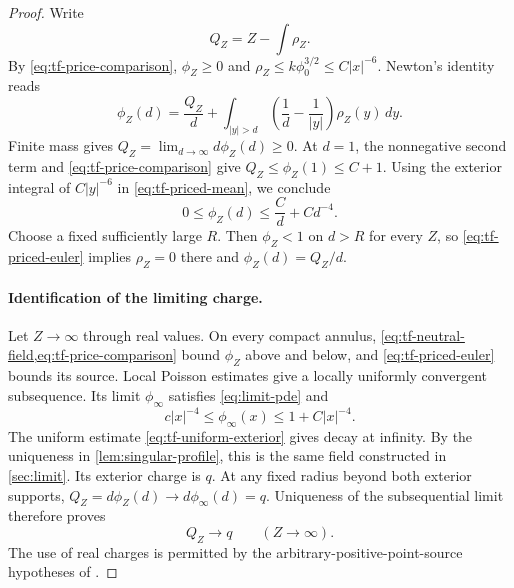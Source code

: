 \begin{proof}
Write
\[
 Q_Z=Z-\int\rho_Z.
\]
By \cref{eq:tf-price-comparison}, $\phi_Z\ge0$ and
$\rho_Z\le k\phi_0^{3/2}\le C|x|^{-6}$.  Newton's identity reads
\begin{equation}\label{eq:tf-priced-mean}
 \phi_Z(d)=\frac{Q_Z}{d}
       +\int_{|y|>d}\left(\frac1d-\frac1{|y|}\right)\rho_Z(y)\,dy.
\end{equation}
Finite mass gives $Q_Z=\lim_{d\to\infty}d\phi_Z(d)\ge0$.
At $d=1$, the nonnegative second term and
\cref{eq:tf-price-comparison} give $Q_Z\le\phi_Z(1)\le C+1$.
Using the exterior integral of $C|y|^{-6}$ in
\cref{eq:tf-priced-mean}, we conclude
\begin{equation}\label{eq:tf-uniform-exterior}
 0\le\phi_Z(d)\le\frac C d+Cd^{-4}.
\end{equation}
Choose a fixed sufficiently large $R$.  Then $\phi_Z<1$ on $d>R$ for
every $Z$, so \cref{eq:tf-priced-euler} implies $\rho_Z=0$ there and
$\phi_Z(d)=Q_Z/d$.

\paragraph{Identification of the limiting charge.}
Let $Z\to\infty$ through real values.  On every compact annulus,
\cref{eq:tf-neutral-field,eq:tf-price-comparison} bound $\phi_Z$ above
and below, and \cref{eq:tf-priced-euler} bounds its source.  Local Poisson
estimates give a locally uniformly convergent subsequence.  Its limit
$\phi_\infty$ satisfies \cref{eq:limit-pde} and
\[
 c|x|^{-4}\le\phi_\infty(x)\le1+C|x|^{-4}.
\]
The uniform estimate \cref{eq:tf-uniform-exterior} gives decay at infinity.
By the uniqueness in \cref{lem:singular-profile}, this is the same field
constructed in \cref{sec:limit}.  Its exterior charge is $q$.  At any
fixed radius beyond both exterior supports,
$Q_Z=d\phi_Z(d)\to d\phi_\infty(d)=q$.  Uniqueness of the subsequential
limit therefore proves
\begin{equation}\label{eq:tf-unit-charge}
 Q_Z\longrightarrow q\qquad(Z\longrightarrow\infty).
\end{equation}
The use of real charges is permitted by the arbitrary-positive-point-source
hypotheses of \cite[\FTFPair]{Foundation}.


\end{proof}
